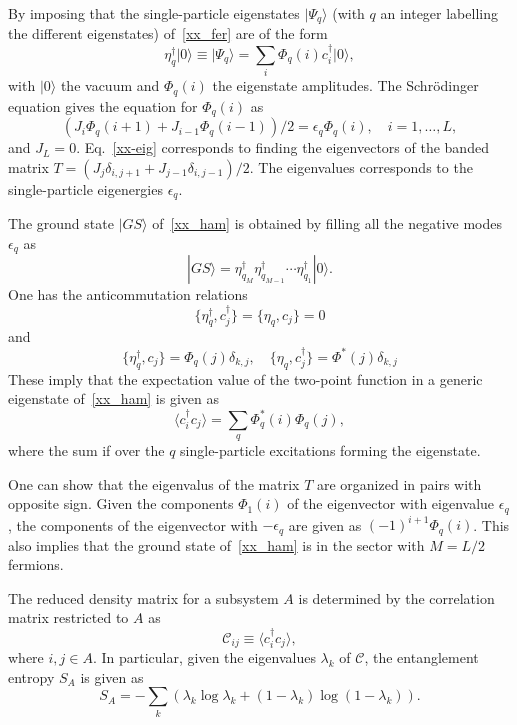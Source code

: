 \documentclass[twocolumn,superscriptaddress,prb,10pt]{revtex4-1}
\begin{document}
By imposing that the single-particle eigenstates $|\Psi_q\rangle$ (with $q$ 
an integer labelling the different eigenstates) of~\eqref{xx_fer} are of 
the form 
%
\begin{equation}
\eta_q^\dagger|0\rangle\equiv|\Psi_q\rangle=\sum_i\Phi_q(i)c_i^\dagger|0\rangle,
\end{equation}
%
with $|0\rangle$ the vacuum and $\Phi_q(i)$ the eigenstate amplitudes. 
The Schr\"odinger equation gives the equation for $\Phi_q(i)$ as 
%
\begin{equation}
\label{xx-eig}
(J_i\Phi_q(i+1)+J_{i-1}\Phi_q(i-1))/2=\epsilon_q\Phi_q(i),\quad i=1,\dots,L, 
\end{equation}
%
and $J_L=0$. Eq.~\eqref{xx-eig} corresponds to finding the eigenvectors 
of the banded matrix $T=(J_j\delta_{i,j+1}+J_{j-1}\delta_{i,j-1})/2$. The eigenvalues 
corresponds to the single-particle eigenergies $\epsilon_q$. 

The ground state $|GS\rangle$ of~\eqref{xx_ham} is obtained by filling all the 
negative modes $\epsilon_q$ as 
%
\begin{equation}
|GS\rangle=\eta^\dagger_{q_M}\eta^\dagger_{q_{M-1}}\cdots\eta_{q_1}^\dagger|0\rangle.
\end{equation}
%
One has the anticommutation relations
%
\begin{equation}
\{\eta^\dagger_q,c^\dagger_j\}=\{\eta_q,c_j\}=0
\end{equation}
%
and
%
\begin{equation}
\{\eta_q^\dagger,c_j\}=\Phi_q(j)\delta_{k,j},\quad\{\eta_q,c^\dagger_j\}=\Phi^*(j)
\delta_{k,j}
\end{equation}
%
These imply that the expectation value of the two-point function in a generic 
eigenstate of~\eqref{xx_ham} is given as 
%
\begin{equation}
\langle c_i^\dagger c_j\rangle=\sum_{q}\Phi_q^*(i)\Phi_q(j), 
\end{equation}
%
where the sum if over the $q$ single-particle excitations forming the 
eigenstate. 

One can show that the eigenvalus of the matrix $T$ are organized in pairs with 
opposite sign. Given the components $\Phi_1(i)$ of the eigenvector with eigenvalue 
$\epsilon_q$, the components of the eigenvector with $-\epsilon_q$ are given 
as $(-1)^{i+1}\Phi_q(i)$. This also implies that the ground state of~\eqref{xx_ham} 
is in the sector with $M=L/2$ fermions. 

The reduced density matrix for a subsystem $A$ is determined by the correlation 
matrix restricted to $A$ as 
%
\begin{equation}
{\mathcal C}_{ij}\equiv\langle c_i^\dagger c_j\rangle, 
\end{equation}
%
where $i,j\in A$. In particular, given the eigenvalues $\lambda_k$ of ${\mathcal C}$, 
the entanglement entropy $S_A$ is given as 
%
\begin{equation}
S_A=-\sum_k(\lambda_k\log\lambda_k+(1-\lambda_k)\log(1-\lambda_k)).
\end{equation}
%
\end{document}
